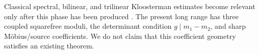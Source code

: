 Classical spectral, bilinear, and trilinear Kloosterman estimates become
relevant only after this phase has been produced
\citep{DeshouillersIwaniec1982,DukeFriedlanderIwaniec1997,
BettinChandee2018,Wright2026}.  The
present long range has three coupled squarefree moduli, the determinant
condition \(g\mid m_1-m_2\), and sharp M\"obius/source coefficients.
We do not claim that this coefficient geometry satisfies an existing
theorem.

